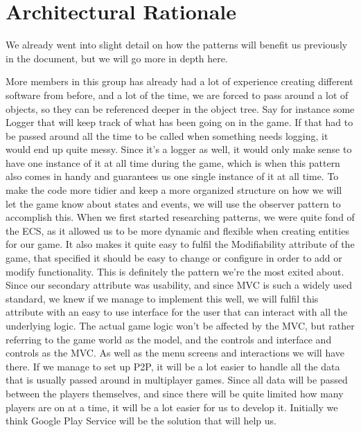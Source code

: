 \section{Architectural Rationale}
We already went into slight detail on how the patterns will benefit us previously in the document, but we will go more in depth here.

\tab More members in this group has already had a lot of experience creating different software from before, and a lot of the time, we are forced to pass around a lot of objects, so they can be referenced deeper in the object tree. Say for instance some Logger that will keep track of what has been going on in the game. If that had to be passed around all the time to be called when something needs logging, it would end up quite messy. 
Since it's a logger as well, it would only make sense to have one instance of it at all time during the game, which is when this pattern also comes in handy and guarantees us one single instance of it at all time.
\tab To make the code more tidier and keep a more organized structure on how we will let the game know about states and events, we will use the observer pattern to accomplish this.
\tab When we first started researching patterns, we were quite fond of the ECS, as it allowed us to be more dynamic and flexible when creating entities for our game. It also makes it quite easy to fulfil the Modifiability attribute of the game, that specified it should be easy to change or configure in order to add or modify functionality. This is definitely the pattern we're the most exited about.
\tab Since our secondary attribute was usability, and since MVC is such a widely used standard, we knew if we manage to implement this well, we will fulfil this attribute with an easy to use interface for the user that can interact with all the underlying logic.
\tab The actual game logic won't be affected by the MVC, but rather referring to the game world as the model, and the controls and interface and controls as the MVC. As well as the menu screens and interactions we will have there.
\tab If we manage to set up P2P, it will be a lot easier to handle all the data that is usually passed around in multiplayer games. Since all data will be passed between the players themselves, and since there will be quite limited how many players are on at a time, it will be a lot easier for us to develop it. Initially we think Google Play Service will be the solution that will help us.
